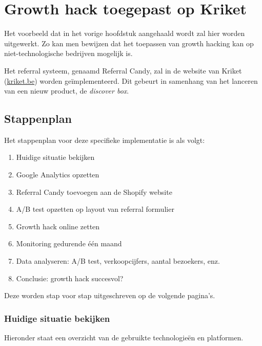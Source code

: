 
\chapter{Growth hack toegepast op Kriket}
\label{ch:implementatie}

Het voorbeeld dat in het vorige hoofdstuk aangehaald wordt zal hier worden uitgewerkt. Zo kan men bewijzen dat het toepassen van growth hacking kan op niet-technologische bedrijven mogelijk is. 

Het referral systeem, genaamd Referral Candy, zal in de website van Kriket (\href{https://kriket.be}{kriket.be}) worden geïmplementeerd. Dit gebeurt in samenhang van het lanceren van een nieuw product, de \emph{discover box}.

\section{Stappenplan}
\label{sec:implementatie-stappenplan}

Het stappenplan voor deze specifieke implementatie is als volgt:

\begin{enumerate}
	\item Huidige situatie bekijken
	\item Google Analytics opzetten
	\item Referral Candy toevoegen aan de Shopify website
	\item A/B test opzetten op layout van referral formulier
	\item Growth hack online zetten
	\item Monitoring gedurende één maand
	\item Data analyseren: A/B test, verkoopcijfers, aantal bezoekers, enz.
	\item Conclusie: growth hack succesvol?
\end{enumerate}

Deze worden stap voor stap uitgeschreven op de volgende pagina's. 

\subsection{Huidige situatie bekijken} \label{sec:huidige-situatie-analyseren}

Hieronder staat een overzicht van de gebruikte technologieën en platformen.

